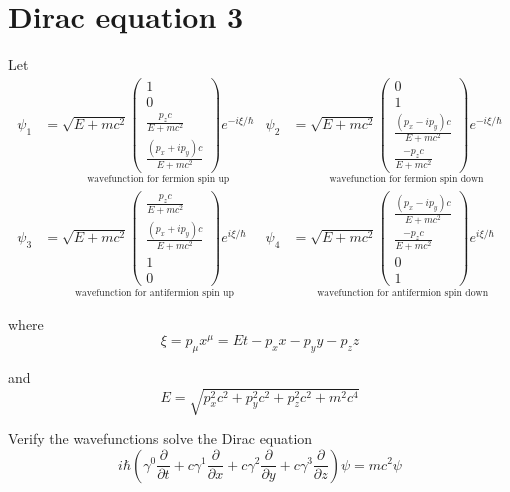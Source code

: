 

\section*{Dirac equation 3}

Let
\begin{align*}
\psi_1&=\underset{\text{wavefunction for fermion spin up}}
{
\sqrt{E+mc^2}
\begin{pmatrix}1\\0\\\frac{p_zc}{E+mc^2}\\\frac{(p_x+ip_y)c}{E+mc^2}\end{pmatrix}
e^{-i\xi/\hbar}
}
&
\psi_2&=\underset{\text{wavefunction for fermion spin down}}
{
\sqrt{E+mc^2}
\begin{pmatrix}0\\1\\\frac{(p_x-ip_y)c}{E+mc^2}\\\frac{-p_zc}{E+mc^2}\end{pmatrix}
e^{-i\xi/\hbar}
}
\\[1ex]
\psi_3&=\underset{\text{wavefunction for antifermion spin up}}
{
\sqrt{E+mc^2}
\begin{pmatrix}\frac{p_zc}{E+mc^2}\\\frac{(p_x+ip_y)c}{E+mc^2}\\1\\0\end{pmatrix}
e^{i\xi/\hbar}
}
&
\psi_4&=\underset{\text{wavefunction for antifermion spin down}}
{
\sqrt{E+mc^2}
\begin{pmatrix}\frac{(p_x-ip_y)c}{E+mc^2}\\\frac{-p_zc}{E+mc^2}\\0\\1\end{pmatrix}
e^{i\xi/\hbar}
}
\end{align*}

where
\begin{equation*}
\xi=p_\mu x^\mu=Et-p_xx-p_yy-p_zz
\end{equation*}

and
\begin{equation*}
E=\sqrt{p_x^2c^2+p_y^2c^2+p_z^2c^2+m^2c^4}
\end{equation*}

Verify the wavefunctions solve the Dirac equation
\begin{equation*}
i\hbar\left(
\gamma^0\frac{\partial}{\partial t}+
c\gamma^1\frac{\partial}{\partial x}+
c\gamma^2\frac{\partial}{\partial y}+
c\gamma^3\frac{\partial}{\partial z}
\right)\psi
=mc^2\psi
\end{equation*}

